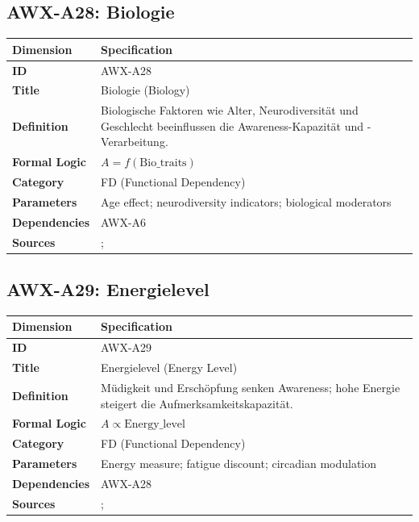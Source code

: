 
\subsection{AWX-A28: Biologie}

\begin{table}[htbp]
\small
\begin{tabular}{p{3cm}p{11cm}}
\toprule
\textbf{Dimension} & \textbf{Specification} \\
\midrule
\textbf{ID} & AWX-A28 \\
\textbf{Title} & Biologie (Biology) \\
\textbf{Definition} & Biologische Faktoren wie Alter, Neurodiversität und Geschlecht beeinflussen die Awareness-Kapazität und -Verarbeitung. \\
\textbf{Formal Logic} & $A = f(\text{Bio\_traits})$ \\
\textbf{Category} & FD (Functional Dependency) \\
\textbf{Parameters} & Age effect; neurodiversity indicators; biological moderators \\
\textbf{Dependencies} & AWX-A6 \\
\textbf{Sources} & \citet{heckman2006effects}; \citet{cunha2007technology} \\
\bottomrule
\end{tabular}
\end{table}


\subsection{AWX-A29: Energielevel}

\begin{table}[htbp]
\small
\begin{tabular}{p{3cm}p{11cm}}
\toprule
\textbf{Dimension} & \textbf{Specification} \\
\midrule
\textbf{ID} & AWX-A29 \\
\textbf{Title} & Energielevel (Energy Level) \\
\textbf{Definition} & Müdigkeit und Erschöpfung senken Awareness; hohe Energie steigert die Aufmerksamkeitskapazität. \\
\textbf{Formal Logic} & $A \propto \text{Energy\_level}$ \\
\textbf{Category} & FD (Functional Dependency) \\
\textbf{Parameters} & Energy measure; fatigue discount; circadian modulation \\
\textbf{Dependencies} & AWX-A28 \\
\textbf{Sources} & \citet{baumeister1998ego}; \citet{kahneman2003maps} \\
\bottomrule
\end{tabular}
\end{table}

